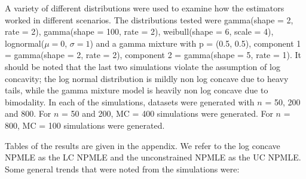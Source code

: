 \documentclass[12pt]{article}
\numberwithin{equation}{section}
\begin{document}
	A variety of different distributions were used to examine how the estimators worked in different scenarios. The distributions tested were gamma(shape = 2, rate = 2), gamma(shape = 100, rate = 2), weibull(shape = 6, scale = 4),  lognormal($\mu = 0$, $\sigma = 1$) and a gamma mixture with p = (0.5, 0.5), component 1 = gamma(shape = 2, rate = 2), component 2 = gamma(shape = 5, rate = 1). It should be noted that the last two simulations violate the assumption of log concavity; the log normal distribution is mildly non log concave due to heavy tails, while the gamma mixture model is heavily non log concave due to bimodality. In each of the simulations, datasets were generated with $n$ = 50, 200 and 800. For $n$ = 50 and 200, MC = 400 simulations were generated. For $n$ = 800, MC = 100 simulations were generated.
	
	Tables of the results are given in the appendix. We refer to the log concave NPMLE as the LC NPMLE and the unconstrained NPMLE as the UC NPMLE. Some general trends that were noted from the simulations were:
	
\vspace{3mm}	
	
\end{document}

